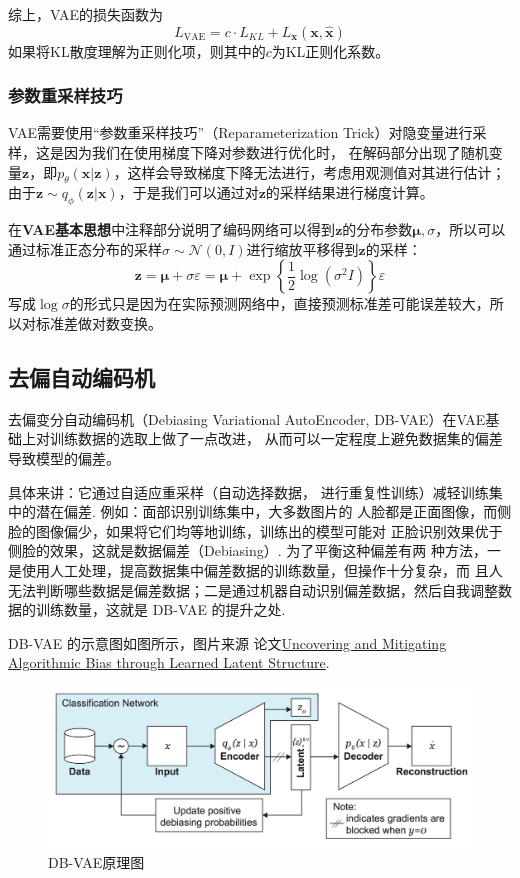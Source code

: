 \documentclass[12pt, a4paper, oneside]{ctexart}
\def\bd{\boldsymbol}        %
\begin{document}
综上，VAE的损失函数为
\begin{equation}\label{eq-vae-loss}
    L_{\text{VAE}} = c\cdot L_{KL} + L_{\bd{x}}(\bd{x},\hat{\bd{x}})
\end{equation}
如果将KL散度理解为正则化项，则其中的$c$为KL正则化系数。
\subsubsection{参数重采样技巧}
VAE需要使用“参数重采样技巧”（Reparameterization Trick）对隐变量进行采样，这是因为我们在使用梯度下降对参数进行优化时，
在解码部分出现了随机变量$\bd{z}$，即$p_{\theta}(\bd{x}|\bd{z})$，这样会导致梯度下降无法进行，考虑用观测值对其进行估计；
由于$\bd{z}\sim q_{\phi}(\bd{z}|\bd{x})$，于是我们可以通过对$\bd{z}$的采样结果进行梯度计算。

在\textbf{VAE基本思想}中注释部分说明了编码网络可以得到$\bd{z}$的分布参数$\bd{\mu},\sigma$，所以可以通过标准正态分布的采样$\sigma\sim\mathcal{N}(0,I)$进行缩放平移得到$\bd{z}$的采样：
\begin{equation*}
    \bd{z} = \bd{\mu} + \sigma\varepsilon = \bd{\mu}+\exp\left\{\frac{1}{2}\log(\sigma^2I)\right\}\varepsilon
\end{equation*}
写成$\log\sigma$的形式只是因为在实际预测网络中，直接预测标准差可能误差较大，所以对标准差做对数变换。

\subsection{去偏自动编码机}
去偏变分自动编码机（Debiasing Variational AutoEncoder, DB-VAE）在VAE基础上对训练数据的选取上做了一点改进，
从而可以一定程度上避免数据集的偏差导致模型的偏差。

具体来讲：它通过自适应重采样（自动选择数据，
进行重复性训练）减轻训练集中的潜在偏差. 例如：面部识别训练集中，大多数图片的
人脸都是正面图像，而侧脸的图像偏少，如果将它们均等地训练，训练出的模型可能对
正脸识别效果优于侧脸的效果，这就是数据偏差（Debiasing）. 为了平衡这种偏差有两
种方法，一是使用人工处理，提高数据集中偏差数据的训练数量，但操作十分复杂，而
且人无法判断哪些数据是偏差数据；二是通过机器自动识别偏差数据，然后自我调整数
据的训练数量，这就是 DB-VAE 的提升之处.

DB-VAE 的示意图如图所示，图片来源
论文\href{http://introtodeeplearning.com/AAAI_MitigatingAlgorithmicBias.pdf}{Uncovering and Mitigating Algorithmic Bias through Learned Latent Structure}.
\begin{figure}[htbp]
    \centering
    \includegraphics[scale=0.4]{./code/figures/DB-VAE/DB-VAE.png}
    \caption{DB-VAE原理图}
\end{figure}
\end{document}
